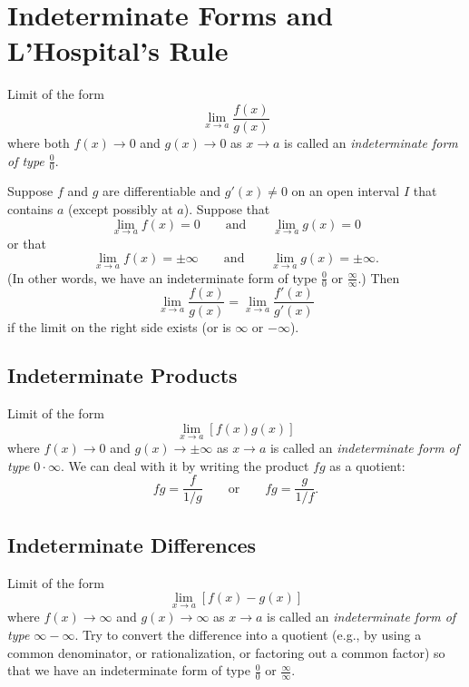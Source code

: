 \section{Indeterminate Forms and L'Hospital's Rule}
Limit of the form
\[
\lim_{x\to a}\frac{f(x)}{g(x)}
\]
where both $f(x)\to 0$ and $g(x)\to 0$ as $x\to a$ is called an
\emph{indeterminate form of type $\frac{0}{0}$}.
\begin{theorem}
Suppose $f$ and $g$ are differentiable and $g'(x)\neq 0$ on an
open interval $I$ that contains $a$ (except possibly at
$a$). Suppose that
\[
\lim_{x\to a}f(x)=0\qquad\text{and}\qquad\lim_{x\to a}g(x)=0
\]
or that
\[
\lim_{x\to a}f(x)=\pm\infty\qquad\text{and}\qquad\lim_{x\to a}g(x)=\pm\infty.
\]
(In other words, we have an indeterminate form of type
$\frac{0}{0}$ or $\frac{\infty}{\infty}$.) Then
\[
\lim_{x\to a}\frac{f(x)}{g(x)}=\lim_{x\to a}\frac{f'(x)}{g'(x)}
\]
if the limit on the right side exists (or is $\infty$ or $-\infty$).
\end{theorem}
\subsection{Indeterminate Products}
Limit of the form
\[
\lim_{x\to a}[f(x)g(x)]
\]
where $f(x)\to 0$ and $g(x)\to \pm\infty$ as $x\to a$ is called an
\emph{indeterminate form of type $0\cdot\infty$}. We can deal
with it by writing the product $fg$ as a quotient:
\[
fg=\frac{f}{1/g}\qquad\text{or}\qquad fg=\frac{g}{1/f}.
\]
\subsection{Indeterminate Differences}
Limit of the form
\[
\lim_{x\to a}[f(x)-g(x)]
\]
where $f(x)\to \infty$ and $g(x)\to\infty$ as $x\to a$ is called an
\emph{indeterminate form of type $\infty-\infty$}. Try to convert
the difference into a quotient (e.g., by using a common
denominator, or rationalization, or factoring out a common
factor) so that we have an indeterminate form of type
$\frac{0}{0}$ or $\frac{\infty}{\infty}$.
